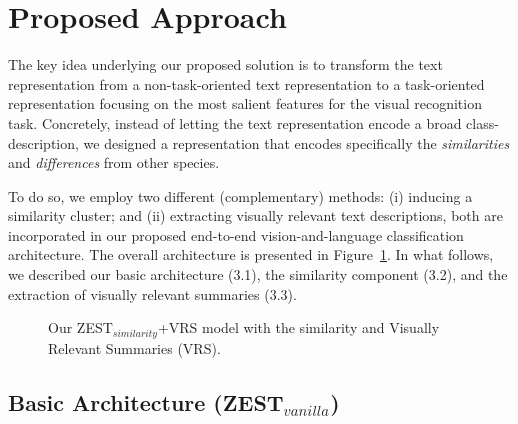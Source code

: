 \documentclass[11pt,a4paper]{article}
\begin{document}

\section{Proposed Approach}
\label{task}

The key idea underlying our proposed solution is to transform the text representation from a non-task-oriented text representation to a task-oriented representation  focusing on the most salient features for the visual recognition task. 
Concretely, instead of letting the text representation encode a broad class-description, we designed a representation that encodes specifically the {\em similarities} and {\em differences} from other species. 

To do so, we employ two different (complementary) methods: (i)  inducing a similarity cluster; and (ii)  extracting visually relevant text descriptions, both are incorporated in our proposed end-to-end vision-and-language classification architecture. 
The overall  architecture is presented in Figure~\ref{fig:model}. In what follows, we described our basic architecture (3.1), the similarity component (3.2), and the extraction of visually relevant summaries (3.3).


\begin{figure}[th]
\centering
{}
 \caption{Our ZEST$_{similarity}$+VRS model with the similarity and Visually Relevant Summaries (VRS).}
\label{fig:model}
\end{figure}
\subsection{Basic Architecture (ZEST$_{vanilla}$)}
\label{section_ZEST_C}
\end{document}
